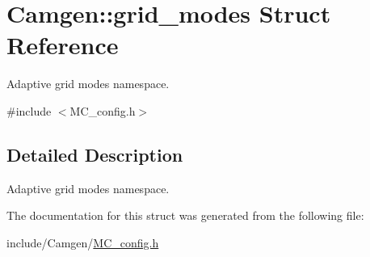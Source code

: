 \hypertarget{a00251}{\section{Camgen\-:\-:grid\-\_\-modes Struct Reference}
\label{a00251}
}


Adaptive grid modes namespace.  




{\ttfamily \#include $<$M\-C\-\_\-config.\-h$>$}



\subsection{Detailed Description}
Adaptive grid modes namespace. 

The documentation for this struct was generated from the following file\-:\begin{DoxyCompactItemize}
\item 
include/\-Camgen/\hyperlink{a00670}{M\-C\-\_\-config.\-h}\end{DoxyCompactItemize}
